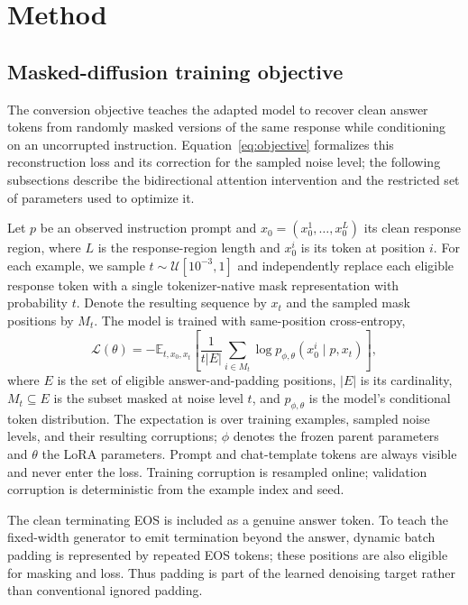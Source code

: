\documentclass{article}
\begin{document}
\section{Method}

\subsection{Masked-diffusion training objective}

The conversion objective teaches the adapted model to recover clean answer tokens from randomly masked versions of the same response while conditioning on an uncorrupted instruction. Equation~\ref{eq:objective} formalizes this reconstruction loss and its correction for the sampled noise level; the following subsections describe the bidirectional attention intervention and the restricted set of parameters used to optimize it.

Let $p$ be an observed instruction prompt and $x_0=(x_0^1,\ldots,x_0^L)$ its clean response region, where $L$ is the response-region length and $x_0^i$ is its token at position $i$. For each example, we sample
$t\sim\mathcal{U}[10^{-3},1]$ and independently replace each eligible response token with a single tokenizer-native mask representation with probability $t$. Denote the resulting sequence by $x_t$ and the sampled mask positions by $M_t$. The model is trained with same-position cross-entropy,
\begin{equation}
    \mathcal{L}(\theta) =
    -\mathbb{E}_{t,x_0,x_t}
    \left[
    \frac{1}{t|E|}\sum_{i\in M_t}
    \log p_{\phi,\theta}(x_0^i\mid p,x_t)
    \right],
    \label{eq:objective}
\end{equation}
where $E$ is the set of eligible answer-and-padding positions, $|E|$ is its cardinality, $M_t\subseteq E$ is the subset masked at noise level $t$, and $p_{\phi,\theta}$ is the model's conditional token distribution. The expectation is over training examples, sampled noise levels, and their resulting corruptions; $\phi$ denotes the frozen parent parameters and $\theta$ the LoRA parameters. Prompt and chat-template tokens are always visible and never enter the loss. Training corruption is resampled online; validation corruption is deterministic from the example index and seed.

The clean terminating EOS is included as a genuine answer token. To teach the fixed-width generator to emit termination beyond the answer, dynamic batch padding is represented by repeated EOS tokens; these positions are also eligible for masking and loss. Thus padding is part of the learned denoising target rather than conventional ignored padding.
\end{document}
